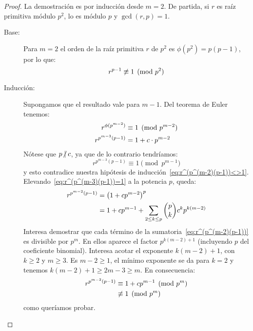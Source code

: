   \begin{proof}
    La demostración es por inducción desde \(m = 2\).%
    De partida,
    si \(r\) es raíz primitiva módulo \(p^2\),
    lo es módulo \(p\) y \(\gcd(r, p) = 1\).
    \begin{description}
    \item[Base:]
      Para \(m = 2\)
      el orden de la raíz primitiva \(r\) de \(p^2\)
      es \(\phi(p^2) = p (p - 1)\),
      por lo que:
      \begin{equation}
	\label{eq:r^(p-1)<>1}
	r^{p - 1}
	  \centernot\equiv 1 \pmod{p^2}
      \end{equation}
    \item[Inducción:]
      Supongamos que el resultado vale para \(m - 1\).
      Del teorema de Euler%
      tenemos:
      \begin{align}
	r^{\phi(p^{m - 2})}
	  &\equiv 1 \pmod{p^{m - 2}} \notag \\
	r^{p^{m - 3} (p - 1)}
	  &=	  1 + c \cdot p^{m - 2} \label{eq:r^(p^(m-3)(p-1))}
      \end{align}
      Nótese que \(p \centernot\mid c\),
      ya que de lo contrario tendríamos:
      \begin{equation}
	\label{eq:r^(p^(m-3)(p-1))=1}
	r^{p^{m - 3} (p - 1)}
	  \equiv 1 \pmod{p^{m - 1}}
      \end{equation}
      y esto contradice
      nuestra hipótesis de inducción~\eqref{eq:r^(p^(m-2)(p-1))<>1}.
      Elevando~\eqref{eq:r^(p^(m-3)(p-1))=1} a la potencia \(p\),
      queda:
      \begin{align}
	r^{p^{m - 2} (p - 1)}
	  &= \left(1 + c p^{m - 2}\right)^p \notag \\
	  &= 1 + c p^{m - 1}
	      + \sum_{2 \le k \le p} \binom{p}{k} c^k p^{k (m - 2)}
	  \label{eq:r^(p^(m-2)(p-1))}
      \end{align}
      Interesa demostrar
      que cada término de la sumatoria~\eqref{eq:r^(p^(m-2)(p-1))}
      es divisible por \(p^m\).
      En ellos aparece el factor \(p^{k (m - 2) + 1}\)
      (incluyendo \(p\) del coeficiente binomial).%
      Interesa acotar el exponente \(k (m - 2) + 1\),
      con \(k \ge 2\) y \(m \ge 3\).
      Es \(m - 2 \ge 1\),
      el mínimo exponente se da para \(k = 2\)
      y tenemos \(k (m - 2) + 1 \ge 2 m - 3 \ge m\).
      En consecuencia:
      \begin{align*}
	r^{p^{m - 2} (p - 1)}
	  &\equiv     1 + c p^{m - 1} \pmod{p^m} \\
	  &\centernot\equiv 1 \pmod{p^m}
      \end{align*}
      como queríamos probar.
      \qedhere
    \end{description}
  \end{proof}

